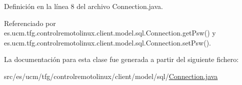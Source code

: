 Definición en la línea 8 del archivo Connection.\-java.



Referenciado por es.\-ucm.\-tfg.\-controlremotolinux.\-client.\-model.\-sql.\-Connection.\-get\-Psw() y es.\-ucm.\-tfg.\-controlremotolinux.\-client.\-model.\-sql.\-Connection.\-set\-Psw().



La documentación para esta clase fue generada a partir del siguiente fichero\-:\begin{DoxyCompactItemize}
\item 
src/es/ucm/tfg/controlremotolinux/client/model/sql/\hyperlink{Connection_8java}{Connection.\-java}\end{DoxyCompactItemize}
